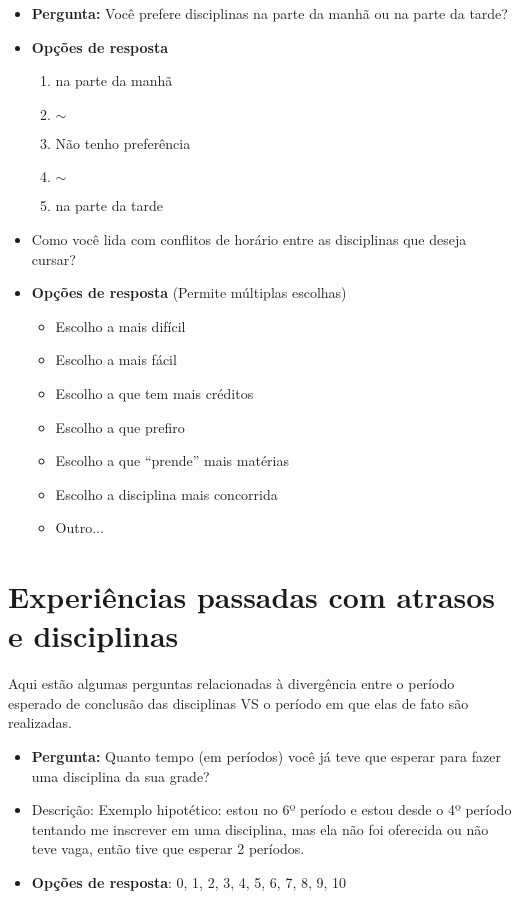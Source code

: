 \begin{apendicesenv}
  \begin{itemize}
    \item \textbf{Pergunta:} Você prefere disciplinas na parte da manhã ou na parte da tarde?
    \item \textbf{Opções de resposta}
          \begin{enumerate}
            \item na parte da manhã
            \item $\sim$
            \item Não tenho preferência
            \item $\sim$
            \item na parte da tarde
          \end{enumerate}
  \end{itemize}

  \begin{itemize}
    \item Como você lida com conflitos de horário entre as disciplinas que deseja cursar?
    \item \textbf{Opções de resposta} (Permite múltiplas escolhas)
          \begin{itemize}
            \item Escolho a mais difícil
            \item Escolho a mais fácil
            \item Escolho a que tem mais créditos
            \item Escolho a que prefiro
            \item Escolho a que ``prende'' mais matérias
            \item Escolho a disciplina mais concorrida
            \item Outro...
          \end{itemize}
  \end{itemize}

  \section*{Experiências passadas com atrasos e disciplinas}

  Aqui estão algumas perguntas relacionadas à divergência entre o período esperado de conclusão das disciplinas VS o período em que elas de fato são realizadas.

  \begin{itemize}
    \item \textbf{Pergunta:} Quanto tempo (em períodos) você já teve que esperar para fazer uma disciplina da sua grade?
    \item Descrição: Exemplo hipotético: estou no 6º período e estou desde o 4º período tentando me inscrever em uma disciplina, mas ela não foi oferecida ou não teve vaga, então tive que esperar 2 períodos.
    \item \textbf{Opções de resposta}: 0, 1, 2, 3, 4, 5, 6, 7, 8, 9, 10
  \end{itemize}


\end{apendicesenv}

